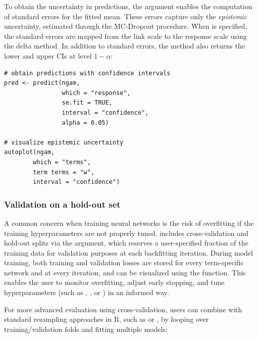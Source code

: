 To obtain the uncertainty in predictions, the argument  enables the computation of standard errors for the fitted mean. These errors capture only the \emph{epistemic} uncertainty, estimated through the MC-Dropout procedure. When  is specified, the standard errors are mapped from the link scale to the response scale using the delta method. In addition to standard errors, the  method also returns the lower and upper CIs at level $1-\alpha$: 

\begin{Verbatim}
# obtain predictions with confidence intervals
pred <- predict(ngam, 
                which = "response", 
                se.fit = TRUE, 
                interval = "confidence", 
                alpha = 0.05)

# visualize epistemic uncertainty
autoplot(ngam, 
        which = "terms", 
        term terms = "w", 
        interval = "confidence")
\end{Verbatim}

\subsubsection{Validation on a hold-out set}

A common concern when training neural networks is the risk of overfitting if the training hyperparameters are not properly tuned.  includes cross-validation and hold-out splits via the  argument, which reserves a user-specified fraction of the training data for validation purposes at each backfitting iteration. During model training, both training and validation losses are stored for every term-specific network and at every iteration, and can be visualized using the  function. This enables the user to monitor overfitting, adjust early stopping, and tune hyperparameters (such as , , or ) in an informed way.

For more advanced evaluation using cross-validation, users can combine  with standard resampling approaches in \textsf{R}, such as  or , by looping over training/validation folds and fitting multiple  models:

